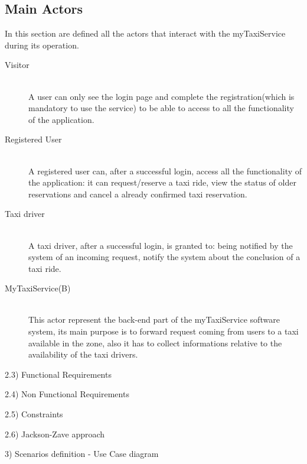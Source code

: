 \documentclass[11pt]{article} %
\begin{document}
  \subsection{Main Actors}
    In this section are defined all the actors that interact with the myTaxiService during its operation.
    \begin{description}
      \item [Visitor] \hfill \\
          A user can only see the login page and complete the registration(which is mandatory to use the service)
          to be able to access to all the functionality of the application.

      \item [Registered User]\hfill \\
          A registered user can, after a successful login, access all the functionality of the application: it can
          request/reserve a taxi ride, view the status of older reservations and cancel a already confirmed taxi reservation.

      \item [Taxi driver] \hfill \\
          A taxi driver, after a successful login, is granted to: being notified by the system of an incoming request,
          notify the system about the conclusion of a taxi ride.

      \item [MyTaxiService(B)] \hfill \\
          This actor represent the back-end part of the myTaxiService software system, its main purpose is to forward request
          coming from users to a taxi available in the zone, also it has to collect informations relative to the availability
          of the taxi drivers.
    \end{description}

    2.3) Functional Requirements

    2.4) Non Functional Requirements

    2.5) Constraints

    2.6) Jackson-Zave approach

3) Scenarios definition - Use Case diagram
\end{document}
